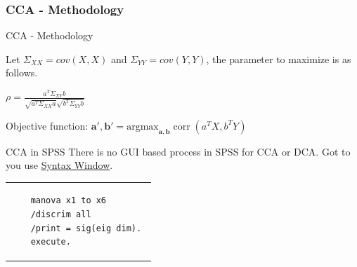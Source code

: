 \documentclass{beamer}
\begin{document}
\subsubsection{CCA - Methodology}

\begin{frame}{CCA - Methodology}
	\begin{center}
Let $\Sigma_{XX}=cov(X,X)$ and $\Sigma_{YY}=cov(Y,Y)$, the parameter to maximize is as follows. 

$\rho ={\frac{a^{T}\Sigma_{XY}b}{{\sqrt{a^{T} \Sigma_{XX}a}}{\sqrt{b^{T} \Sigma_{YY}b}}}}$
		
	\end{center}

Objective function: $\mathbf{a'},\mathbf{b'} ={\mbox{argmax}}_{\mathbf{a},\mathbf{b}} \operatorname{corr}(a^{T}X,b^{T}Y)$
\end{frame}	

\begin{frame}[fragile]{CCA in SPSS}
	\centering 
	There is no GUI based process in SPSS for CCA or DCA. Got to you use \underline{Syntax Window}. 
\vspace{1cm}	
	
\begin{tabular}{|p{10cm}}
	\begin{verbatim}
	manova x1 to x6
	/discrim all 
	/print = sig(eig dim). 
	execute. 
	\end{verbatim}
\end{tabular}

\end{frame}
	
\begin{frame}
	
\end{frame}
\end{document}
